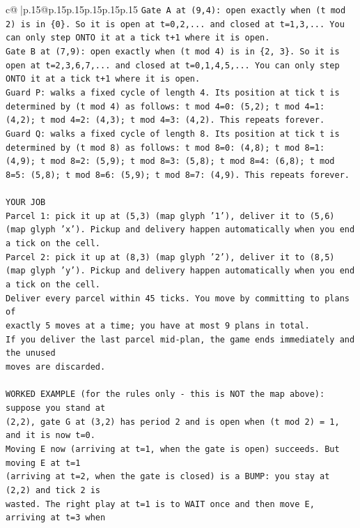 \documentclass{article}
\begin{document}
{\begin{supertabular}{c@{$\;$}|p{.15\linewidth}@{}p{.15\linewidth}p{.15\linewidth}p{.15\linewidth}p{.15\linewidth}p{.15\linewidth}}
{{{\texttt{Gate A at (9,4): open exactly when (t mod 2) is in \{0\}. So it is open at t=0,2,... and closed at t=1,3,... You can only step ONTO it at a tick t+1 where it is open.} \\
\texttt{Gate B at (7,9): open exactly when (t mod 4) is in \{2, 3\}. So it is open at t=2,3,6,7,... and closed at t=0,1,4,5,... You can only step ONTO it at a tick t+1 where it is open.} \\
\texttt{Guard P: walks a fixed cycle of length 4. Its position at tick t is determined by (t mod 4) as follows: t mod 4=0: (5,2); t mod 4=1: (4,2); t mod 4=2: (4,3); t mod 4=3: (4,2). This repeats forever.} \\
\texttt{Guard Q: walks a fixed cycle of length 8. Its position at tick t is determined by (t mod 8) as follows: t mod 8=0: (4,8); t mod 8=1: (4,9); t mod 8=2: (5,9); t mod 8=3: (5,8); t mod 8=4: (6,8); t mod 8=5: (5,8); t mod 8=6: (5,9); t mod 8=7: (4,9). This repeats forever.} \\
\\ 
\texttt{YOUR JOB} \\
\texttt{Parcel 1: pick it up at (5,3) (map glyph '1'), deliver it to (5,6) (map glyph 'x'). Pickup and delivery happen automatically when you end a tick on the cell.} \\
\texttt{Parcel 2: pick it up at (8,3) (map glyph '2'), deliver it to (8,5) (map glyph 'y'). Pickup and delivery happen automatically when you end a tick on the cell.} \\
\texttt{Deliver every parcel within 45 ticks. You move by committing to plans of} \\
\texttt{exactly 5 moves at a time; you have at most 9 plans in total.} \\
\texttt{If you deliver the last parcel mid{-}plan, the game ends immediately and the unused} \\
\texttt{moves are discarded.} \\
\\ 
\texttt{WORKED EXAMPLE (for the rules only {-} this is NOT the map above): suppose you stand at} \\
\texttt{(2,2), gate G at (3,2) has period 2 and is open when (t mod 2) = 1, and it is now t=0.} \\
\texttt{Moving E now (arriving at t=1, when the gate is open) succeeds. But moving E at t=1} \\
\texttt{(arriving at t=2, when the gate is closed) is a BUMP: you stay at (2,2) and tick 2 is} \\
\texttt{wasted. The right play at t=1 is to WAIT once and then move E, arriving at t=3 when} \\
}}}
\end{supertabular}}
\end{document}
